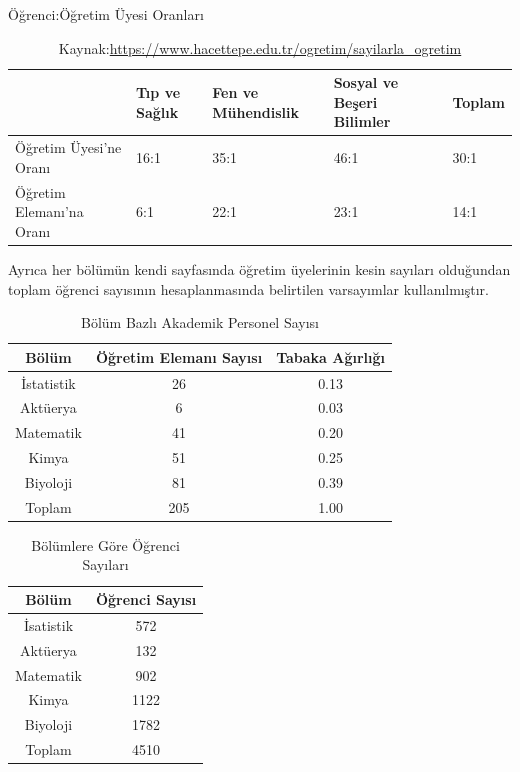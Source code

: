 \documentclass{article}
\begin{document}
\begin{table}[h]

    \centering
    \caption{Öğrenci:Öğretim Üyesi Oranları}
    \label{tab:Öğrenci:Öğretim Üyesi Oranları}

    \begin{tabular}{|p{2.1cm}|p{2.1cm}|p{2.1cm}|p{2.1cm}|p{2.1cm}|}
        \hline
         & Tıp ve Sağlık & Fen ve Mühendislik & Sosyal ve Beşeri Bilimler & Toplam \\
        \hline
        Öğretim Üyesi'ne Oranı & 16:1 & 35:1 & 46:1 & 30:1 \\
        \hline
        Öğretim Elemanı'na Oranı & 6:1 & 22:1 & 23:1 & 14:1 \\
        \hline
    \end{tabular}
    \caption*{\footnotesize Kaynak:\url{https://www.hacettepe.edu.tr/ogretim/sayilarla_ogretim}}
\end{table}

Ayrıca her bölümün kendi sayfasında öğretim üyelerinin kesin sayıları olduğundan toplam öğrenci sayısının hesaplanmasında belirtilen varsayımlar kullanılmıştır.

\begin{table}[h]
    \centering
    \caption{Bölüm Bazlı Akademik Personel Sayısı}
    \label{tab:Bölüm Bazlı Veriler}
    
    \begin{tabular}{|c|c|c|}
         \hline
         Bölüm & Öğretim Elemanı Sayısı & Tabaka Ağırlığı\\
         \hline
         İstatistik & 26 & 0.13 \\
         Aktüerya & 6 & 0.03 \\
         Matematik & 41 & 0.20 \\
         Kimya & 51 & 0.25 \\
         Biyoloji & 81 & 0.39 \\
         \hline
         Toplam & 205 & 1.00 \\
         \hline
    \end{tabular}
\end{table}

\clearpage

\begin{table}[h]
    \centering
    \caption{Bölümlere Göre Öğrenci Sayıları}
    \label{tab:Bölüm bazlı öğrenci sayıları}
    \begin{tabular}{|c|c|}
        \hline
        Bölüm & Öğrenci Sayısı\\
        \hline
        İsatistik & 572 \\
        Aktüerya & 132 \\
        Matematik & 902 \\
        Kimya & 1122 \\
        Biyoloji & 1782 \\
        \hline
        Toplam & 4510 \\
        \hline
    \end{tabular}
\end{table}
\end{document}
